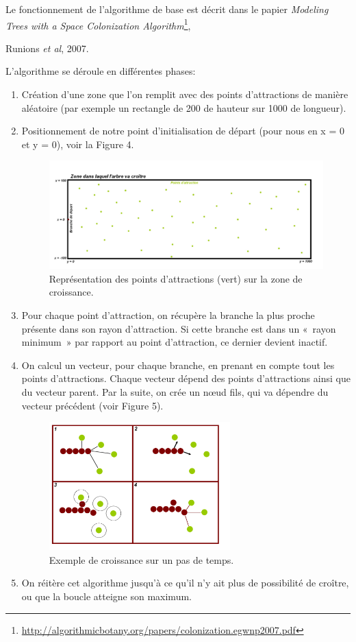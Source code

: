 \documentclass[a4paper]{article}
\begin{document}
		Le fonctionnement de l’algorithme de base est décrit dans le papier \emph{Modeling Trees with a Space Colonization Algorithm}\footnote{\url{http://algorithmicbotany.org/papers/colonization.egwnp2007.pdf}}, {Runions \emph{et al}, 2007.
	
		L’algorithme se déroule en différentes phases:
		\begin{enumerate}
			\item Création d’une zone que l’on remplit avec des points d’attractions de manière aléatoire (par exemple un rectangle de 200 de hauteur sur 1000 de longueur). 
			\item Positionnement de notre point d'initialisation de départ (pour nous en x = 0 et y = 0), voir la Figure 4.

			\begin{figure}[!h]
				\centering
				\includegraphics[width=11cm]{./img/sc.jpg}
				\caption{Représentation des points d'attractions (vert) sur la zone de croissance.}
			\end{figure}
			\item Pour chaque point d’attraction, on récupère la branche la plus proche présente dans son rayon d’attraction. Si cette branche est dans un « rayon minimum » par rapport au point d’attraction, ce dernier devient inactif.

			\item On calcul un vecteur, pour chaque branche, en prenant en compte tout les points d’attractions. Chaque vecteur dépend des points d’attractions ainsi que du vecteur parent. Par la suite, on crée un nœud fils, qui va dépendre du vecteur précédent (voir Figure 5).
			\begin{figure}[!h]
				\centering
				\includegraphics[width=7cm]{./img/sc2.jpg}
				\caption{Exemple de croissance sur un pas de temps.}
			\end{figure}
			\item On réitère cet algorithme jusqu’à ce qu’il n’y ait plus de possibilité de croître, ou que la boucle atteigne son maximum.
		\end{enumerate}


}
\end{document}
